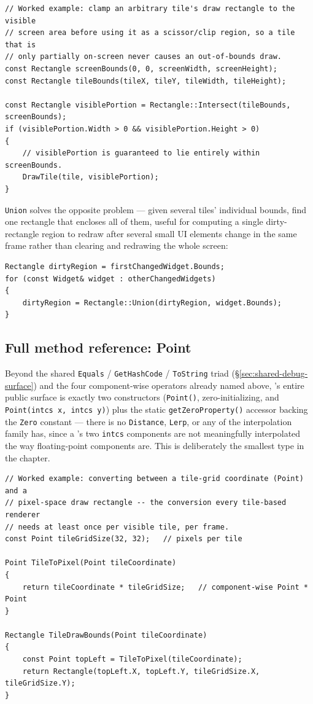 \begin{lstlisting}
// Worked example: clamp an arbitrary tile's draw rectangle to the visible
// screen area before using it as a scissor/clip region, so a tile that is
// only partially on-screen never causes an out-of-bounds draw.
const Rectangle screenBounds(0, 0, screenWidth, screenHeight);
const Rectangle tileBounds(tileX, tileY, tileWidth, tileHeight);

const Rectangle visiblePortion = Rectangle::Intersect(tileBounds, screenBounds);
if (visiblePortion.Width > 0 && visiblePortion.Height > 0)
{
    // visiblePortion is guaranteed to lie entirely within screenBounds.
    DrawTile(tile, visiblePortion);
}
\end{lstlisting}

\texttt{Union} solves the opposite problem --- given several tiles' individual bounds, find one
rectangle that encloses all of them, useful for computing a single dirty-rectangle region to
redraw after several small UI elements change in the same frame rather than clearing and
redrawing the whole screen:

\begin{lstlisting}
Rectangle dirtyRegion = firstChangedWidget.Bounds;
for (const Widget& widget : otherChangedWidgets)
{
    dirtyRegion = Rectangle::Union(dirtyRegion, widget.Bounds);
}
\end{lstlisting}

\subsection{Full method reference: Point}

Beyond the shared \texttt{Equals} / \texttt{GetHashCode} / \texttt{ToString} triad
(\S\ref{sec:shared-debug-surface}) and the four component-wise operators already named above,
's entire public surface is exactly two constructors (\texttt{Point()},
zero-initializing, and \texttt{Point(intcs x, intcs y)}) plus the static \texttt{getZeroProperty()}
accessor backing the \texttt{Zero} constant --- there is no \texttt{Distance}, \texttt{Lerp}, or
any of the interpolation family  has, since a 's two
\texttt{intcs} components are not meaningfully interpolated the way floating-point components
are. This is deliberately the smallest type in the chapter.

\begin{lstlisting}
// Worked example: converting between a tile-grid coordinate (Point) and a
// pixel-space draw rectangle -- the conversion every tile-based renderer
// needs at least once per visible tile, per frame.
const Point tileGridSize(32, 32);   // pixels per tile

Point TileToPixel(Point tileCoordinate)
{
    return tileCoordinate * tileGridSize;   // component-wise Point * Point
}

Rectangle TileDrawBounds(Point tileCoordinate)
{
    const Point topLeft = TileToPixel(tileCoordinate);
    return Rectangle(topLeft.X, topLeft.Y, tileGridSize.X, tileGridSize.Y);
}
\end{lstlisting}

